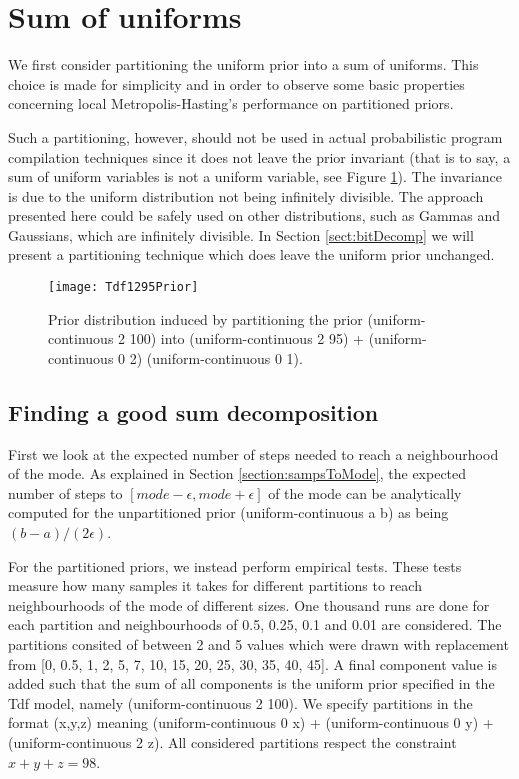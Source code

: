 \section{Sum of uniforms}
\label{sect:sumUnif}

We first consider partitioning the uniform prior into a sum of uniforms. This choice is made for simplicity and in order to observe some basic properties concerning local Metropolis-Hasting's performance on partitioned priors.

Such a partitioning, however, should not be used in actual probabilistic program compilation techniques since it does not leave the prior invariant (that is to say, a sum of uniform variables is not a uniform variable, see Figure \ref{fig:1295Prior}). The invariance is due to the uniform distribution not being infinitely divisible. The approach presented here could be safely used on other distributions, such as Gammas and Gaussians, which are infinitely divisible. In Section \ref{sect:bitDecomp} we will present a partitioning technique which does leave the uniform prior unchanged.

\begin{figure}[h]
    \centering
    \texttt{[image: Tdf1295Prior]}
    \caption{Prior distribution induced by partitioning the prior (uniform-continuous 2 100) into (uniform-continuous 2 95) + (uniform-continuous 0 2) (uniform-continuous 0 1).}
    \label{fig:1295Prior}
\end{figure}

\subsection{Finding a good sum decomposition}
\label{sect:goodSum}
First we look at the expected number of steps needed to reach a neighbourhood of the mode. As explained in Section \ref{section:sampsToMode}, the expected number of steps to $[mode - \epsilon, mode + \epsilon]$ of the mode can be analytically computed for the unpartitioned prior (uniform-continuous a b) as being $(b-a)/(2\epsilon)$.

For the partitioned priors, we instead perform empirical tests. These tests measure how many samples it takes for different partitions to reach neighbourhoods of the mode of different sizes. One thousand runs are done for each partition and neighbourhoods of 0.5, 0.25, 0.1 and 0.01 are considered. The partitions consited of between 2 and 5 values which were drawn with replacement from [0, 0.5, 1, 2, 5, 7, 10, 15, 20, 25, 30, 35, 40, 45]. A final component value is added such that the sum of all components is the uniform prior specified in the Tdf model, namely (uniform-continuous 2 100). We specify partitions in the format (x,y,z) meaning (uniform-continuous 0 x) + (uniform-continuous 0 y) + (uniform-continuous 2 z). All considered partitions respect the constraint $x+y+z = 98$.

